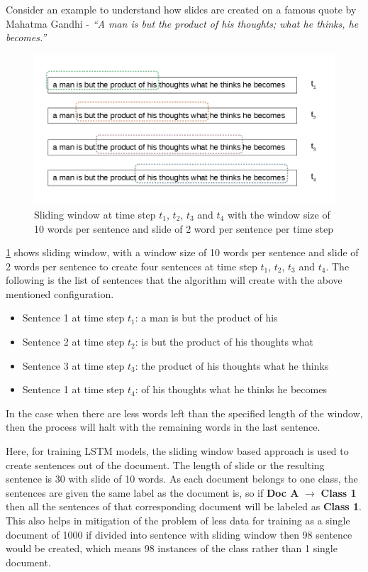 Consider an example to understand how slides are created on a famous quote by Mahatma Gandhi - \textit{``A man is but the product of his thoughts; what he thinks, he becomes.''}

\begin{figure}[!ht]
    \centering
    \includegraphics[width=12cm]{pics/SlidingWindow.jpg}
    \captionsetup{justification=centering,margin=2cm}
    \caption{Sliding window at time step $t_{1}$, $t_{2}$, $t_{3}$ and $t_{4}$ with the window size of 10 words per sentence and slide of 2 word per sentence per time step}
    \label{fig:sldingwindow}
\end{figure}

\ref{fig:sldingwindow} shows sliding window, with a window size of 10 words per sentence and slide of 2 words per sentence to create four sentences at time step $t_{1}$, $t_{2}$, $t_{3}$ and $t_{4}$. The following is the list of sentences that the algorithm will create with the above mentioned configuration.

\begin{itemize}
    \item Sentence 1 at time step $t_{1}$: a man is but the product of his
    \item Sentence 2 at time step $t_{2}$: is but the product of his thoughts what
    \item Sentence 3 at time step $t_{3}$: the product of his thoughts what he thinks
    \item Sentence 1 at time step $t_{4}$: of his thoughts what he thinks he becomes
\end{itemize}

In the case when there are less words left than the specified length of the window, then the process will halt with the remaining words in the last sentence.

Here, for training LSTM models, the sliding window based approach is used to create sentences out of the document. The length of slide or the resulting sentence is 30 with slide of 10 words. As each document belongs to one class, the sentences are given the same label as the document is, so if  \textbf{Doc A} $\rightarrow$  \textbf{Class 1} then all the sentences of that corresponding document will be labeled as \textbf{Class 1}. This also helps in mitigation of the problem of less data for training as a single document of 1000 if divided into sentence with sliding window then 98 sentence would be created, which means 98 instances of the class rather than 1 single document. 


